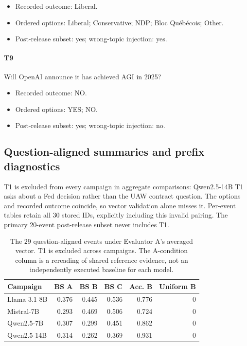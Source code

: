 \begin{itemize}

\item Recorded outcome: Liberal.

\item Ordered options: Liberal; Conservative; NDP; Bloc Québécois; Other.

\item Post-release subset: yes; wrong-topic injection: yes.

\end{itemize}

\paragraph*{T9} Will OpenAI announce it has achieved AGI in 2025?

\begin{itemize}

\item Recorded outcome: NO.

\item Ordered options: YES; NO.

\item Post-release subset: yes; wrong-topic injection: no.

\end{itemize}

\clearpage\subsection{Question-aligned summaries and prefix diagnostics}

T1 is excluded from every campaign in aggregate comparisons: Qwen2.5-14B T1 asks about a Fed decision rather than the UAW contract question. The options and recorded outcome coincide, so vector validation alone misses it. Per-event tables retain all 30 stored IDs, explicitly including this invalid pairing. The primary 20-event post-release subset never includes T1.

\begin{table}[!htbp]
\centering\small
\caption{The 29 question-aligned events under Evaluator A's averaged vector. T1 is excluded across campaigns. The A-condition column is a rereading of shared reference evidence, not an independently executed baseline for each model.}
\label{tab:full_ensemble_summary}
\begin{tabular}{lrrrrr}
\toprule
Campaign & BS A & BS B & BS C & Acc. B & Uniform B \\
\midrule
Llama-3.1-8B & 0.376 & 0.445 & 0.536 & 0.776 & 0 \\
Mistral-7B & 0.293 & 0.469 & 0.506 & 0.724 & 0 \\
Qwen2.5-7B & 0.307 & 0.299 & 0.451 & 0.862 & 0 \\
Qwen2.5-14B & 0.314 & 0.262 & 0.369 & 0.931 & 0 \\
\bottomrule
\end{tabular}
\end{table}


